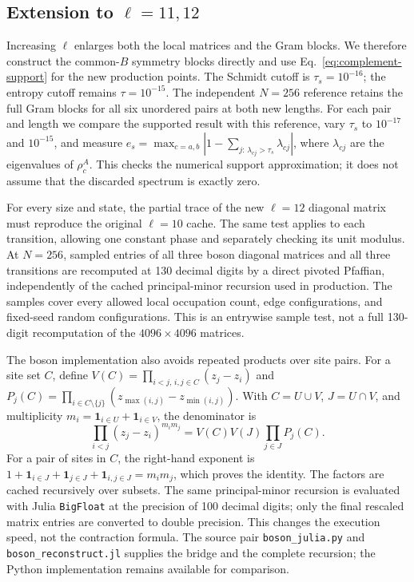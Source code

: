 \subsection{Extension to \texorpdfstring{$\ell=11,12$}{ell=11,12}}
\label{sec:complement-extension-checks}
Increasing $\ell$ enlarges both the local matrices and the Gram blocks.
We therefore construct the common-$B$ symmetry blocks directly and use
Eq.~\eqref{eq:complement-support} for the new production points.
The Schmidt cutoff is $\tau_s=10^{-16}$; the entropy cutoff remains
$\tau=10^{-15}$. The independent $N=256$ reference retains the full
Gram blocks for all six unordered pairs at both new lengths.
For each pair and length we compare the supported result with this
reference, vary $\tau_s$ to $10^{-17}$ and $10^{-15}$, and measure
$e_s=\max_{c=a,b}|1-\sum_{j:\,\lambda_{cj}>\tau_s}\lambda_{cj}|$,
where $\lambda_{cj}$ are the eigenvalues of $\rho_c^A$.
This checks the numerical support approximation; it does not assume
that the discarded spectrum is exactly zero.

For every size and state, the partial trace of the new $\ell=12$
diagonal matrix must reproduce the original $\ell=10$ cache.
The same test applies to each transition, allowing one constant phase
and separately checking its unit modulus. At $N=256$, sampled entries
of all three boson diagonal matrices and all three transitions are
recomputed at 130 decimal digits by a direct pivoted Pfaffian, independently
of the cached principal-minor recursion used in production. The samples
cover every allowed local occupation count, edge configurations, and
fixed-seed random configurations. This is an entrywise sample test,
not a full 130-digit recomputation of the $4096\times4096$ matrices.

The boson implementation also avoids repeated products over site pairs.
For a site set $C$, define
$V(C)=\prod_{i<j,\,i,j\in C}(z_j-z_i)$ and
$P_j(C)=\prod_{i\in C\setminus\{j\}}
(z_{\max(i,j)}-z_{\min(i,j)})$.
With $C=U\cup V$, $J=U\cap V$, and multiplicity
$m_i=\mathbf1_{i\in U}+\mathbf1_{i\in V}$, the denominator is
\begin{equation}
 \prod_{i<j}(z_j-z_i)^{m_i m_j}
 =V(C)V(J)\prod_{j\in J}P_j(C).
 \label{eq:complement-product-cache}
\end{equation}
For a pair of sites in $C$, the right-hand exponent is
$1+\mathbf1_{i\in J}+\mathbf1_{j\in J}
+\mathbf1_{i,j\in J}=m_i m_j$, which proves the identity.
The factors are cached recursively over subsets. The same principal-minor
recursion is evaluated with Julia \texttt{BigFloat} at the precision of
100 decimal digits; only the final rescaled matrix entries are converted
to double precision. This changes the execution speed, not the contraction
formula. The source pair \texttt{boson\_julia.py} and
\texttt{boson\_reconstruct.jl} supplies the bridge and the complete recursion;
the Python implementation remains available for comparison.

